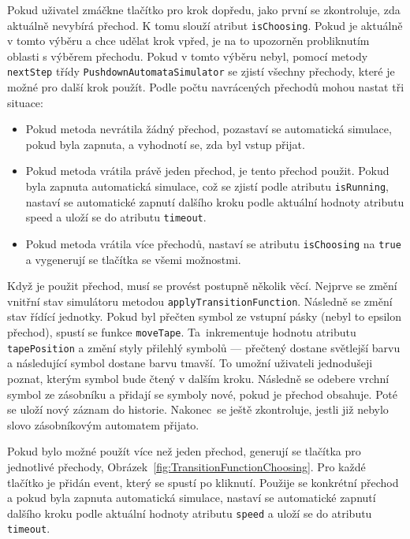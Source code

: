 Pokud uživatel zmáčkne tlačítko pro krok dopředu, jako první se zkontroluje, zda aktuálně nevybírá přechod. K tomu slouží atribut \texttt{isChoosing}. Pokud je aktuálně v tomto výběru a chce udělat krok vpřed, je na to upozorněn probliknutím oblasti s výběrem přechodu. Pokud v tomto výběru nebyl, pomocí metody \texttt{nextStep} třídy \texttt{PushdownAutomataSimulator} se zjistí všechny přechody, které je možné pro další krok použít. Podle počtu navrácených přechodů mohou nastat tři situace:
\begin{itemize}
    \item Pokud metoda nevrátila žádný přechod, pozastaví se automatická simulace, pokud byla zapnuta, a vyhodnotí se, zda byl vstup přijat.
    \item  Pokud metoda vrátila právě jeden přechod, je tento přechod použit. Pokud byla zapnuta automatická simulace, což se zjistí podle atributu \texttt{isRunning}, nastaví se automatické zapnutí dalšího kroku podle aktuální hodnoty atributu speed a uloží se do atributu \texttt{timeout}.
    \item Pokud metoda vrátila více přechodů, nastaví se atributu \texttt{isChoosing} na \texttt{true} a vygenerují se tlačítka se všemi možnostmi.
\end{itemize}

Když je použit přechod, musí se provést postupně několik věcí. Nejprve se změní vnitřní stav simulátoru metodou \texttt{applyTransitionFunction}. Následně se změní stav řídící jednotky. Pokud byl přečten symbol ze vstupní pásky (nebyl to epsilon přechod), spustí se funkce \texttt{moveTape}. Ta~inkrementuje hodnotu atributu \texttt{tapePosition} a změní styly přilehlý symbolů --- přečtený dostane světlejší barvu a následující symbol dostane barvu tmavší. To umožní uživateli jednodušeji poznat, kterým symbol bude čtený v dalším kroku. Následně se odebere vrchní symbol ze zásobníku a přidají se symboly nové, pokud je přechod obsahuje. Poté se uloží nový záznam do historie. Nakonec~se ještě zkontroluje, jestli již nebylo slovo zásobníkovým automatem přijato.

Pokud bylo možné použít více než jeden přechod, generují se tlačítka pro jednotlivé přechody, Obrázek~\ref{fig:TransitionFunctionChoosing}. Pro každé tlačítko je přidán event, který se spustí po kliknutí. Použije se konkrétní přechod a pokud byla zapnuta automatická simulace, nastaví se automatické zapnutí dalšího kroku podle aktuální hodnoty atributu \texttt{speed} a uloží se do atributu \texttt{timeout}.

